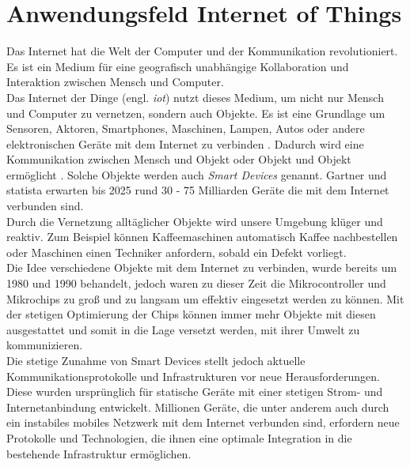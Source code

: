 \section{Anwendungsfeld Internet of Things} \label{s:domain}
Das Internet hat die Welt der Computer und der Kommunikation revolutioniert. Es ist ein Medium für eine geografisch unabhängige Kollaboration und Interaktion zwischen Mensch und Computer.
\cite{BriefHistoryInternet}
\\
Das Internet der Dinge (engl. \textit{\acf{iot}}) nutzt dieses Medium, um nicht nur Mensch und Computer zu vernetzen, sondern auch Objekte. Es ist eine Grundlage um Sensoren, Aktoren, Smartphones, Maschinen, Lampen, Autos oder andere elektronischen Geräte mit dem Internet zu verbinden \cite{morganSimpleExplanationInternet}.
Dadurch wird eine Kommunikation zwischen Mensch und Objekt oder Objekt und Objekt ermöglicht \cite{uckelmannArchitectingInternetThings2011}.
Solche Objekte werden auch \textit{Smart Devices} genannt.
Gartner \cite{hungGartnerInsightsHow} und statista \cite{GlobalIoTNonIoT} erwarten bis 2025 rund 30 - 75 Milliarden Geräte die mit dem Internet verbunden sind.
\\
Durch die Vernetzung alltäglicher Objekte wird unsere Umgebung klüger und reaktiv. Zum Beispiel können Kaffeemaschinen automatisch Kaffee nachbestellen oder Maschinen einen Techniker anfordern, sobald ein Defekt vorliegt.
\cite{rangerWhatIoTEverything}
\\
Die Idee verschiedene Objekte mit dem Internet zu verbinden, wurde bereits um 1980 und 1990 behandelt, jedoch waren zu dieser Zeit die Mikrocontroller und Mikrochips zu gro{\ss} und zu langsam um effektiv eingesetzt werden zu können.
Mit der stetigen Optimierung der Chips können immer mehr Objekte mit diesen ausgestattet und somit in die Lage versetzt werden, mit ihrer Umwelt zu kommunizieren.
\cite{rangerWhatIoTEverything}
\\
Die stetige Zunahme von Smart Devices stellt jedoch aktuelle Kommunikationsprotokolle und Infrastrukturen vor neue Herausforderungen.
Diese wurden ursprünglich für statische Geräte mit einer stetigen Strom- und Internetanbindung entwickelt. Millionen Geräte, die unter anderem auch durch ein instabiles mobiles Netzwerk mit dem Internet verbunden sind, erfordern neue Protokolle und Technologien, die ihnen eine optimale Integration in die bestehende Infrastruktur ermöglichen.
\cite{uckelmannArchitectingInternetThings2011}
\newpage

\begin{comment}
- Describe the (business) domain of your work. Ask yourself: What does the common reader need to know about the domain in order to understand the results of your work? For example, if you work contributes to the claim handling process of some insurance company, describe the common claim handling process.
- Please refrain from meandering explanations about details that have no relevance for later chapters (just in order to increase your page count).
- The header "Domain / Anwendungsfeld" is supposed to be replaced or extended with some more specific header like: "Domain 'Claim handling'"
\end{comment}
